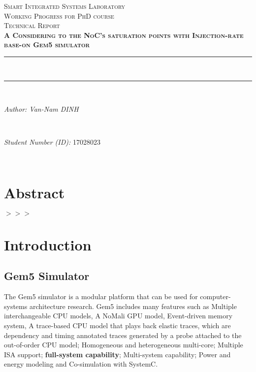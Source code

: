 \documentclass[13pt]{article}
\author{Linus C. Brendel}								%
\date{\today}											%
\begin{document}
	

\begin{titlepage}
	\centering
	\vspace*{0.5 cm}
	\textsc{\LARGE Smart Integrated Systems Laboratory}\\[1.0 cm]	%
	\textsc{\Large Working Progress for PhD course}\\[0.5 cm]				%
	\textsc{\large Technical Report}\\[0.5 cm]				%
	\textsc{\textbf{A Considering to the NoC's saturation points with Injection-rate base-on Gem5 simulator}}
	\rule{\linewidth}{0.2 mm} \\[0.4 cm]
	\rule{\linewidth}{0.2 mm} \\[1.5 cm]
	
	\begin{minipage}{0.4\textwidth}
		\begin{flushleft} \large
			\emph{Author: Van-Nam DINH}\\
		\end{flushleft}
	\end{minipage}~
	\begin{minipage}{0.4\textwidth}
		\begin{flushright} \large
			\emph{Student Number (ID):} 17028023									%
		\end{flushright}
	\end{minipage}\\[2 cm]
	
	
	\vfill
	
\end{titlepage}
	
	\tableofcontents
	\pagebreak
	

\section*{Abstract}
	$>>>$
	
		
\section{Introduction}
	
\subsection{Gem5 Simulator}
	The Gem5 simulator is a modular platform that can be used for computer-systems architecture research. Gem5 includes many features such as Multiple interchangeable CPU models, A NoMali GPU model, Event-driven memory system, A trace-based CPU model that plays back elastic traces, which are dependency and timing annotated traces generated by a probe attached to the out-of-order CPU model; Homogeneous and heterogeneous multi-core; Multiple ISA support; \textbf{full-system capability}; Multi-system capability; Power and energy modeling and Co-simulation with SystemC.
	
\end{document}

